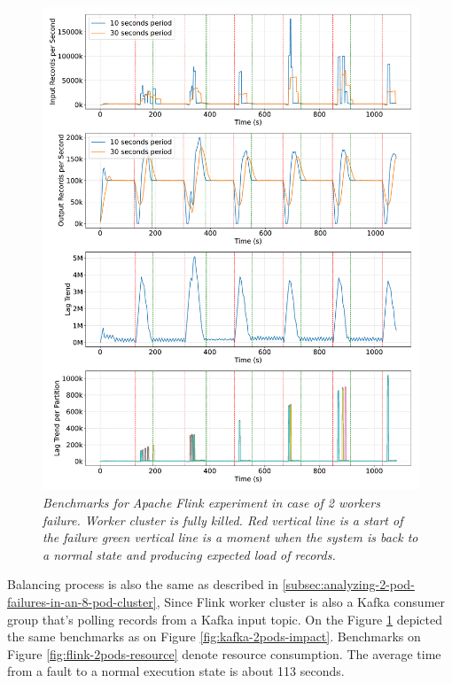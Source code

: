 \begin{figure}[H]
    \centering
    \includegraphics[width=1\textwidth]{figures/flink-2pods/flink_2_pods_plot_impact}
    \caption{\textit{Benchmarks for Apache Flink experiment in case of 2 workers failure. Worker
cluster is fully killed. Red vertical line is a start of the failure green vertical line is a
moment when the system is back to a normal state and producing expected load of records.}}
    \label{fig:flink-2pods-impact}
\end{figure}

Balancing process is also the same as described in \ref{subsec:analyzing-2-pod-failures-in-an-8-pod-cluster},
Since Flink worker cluster is also a Kafka consumer group that's polling records from a Kafka input topic.
On the Figure \ref{fig:flink-2pods-impact} depicted the same benchmarks as on Figure \ref{fig:kafka-2pods-impact}.
Benchmarks on Figure \ref{fig:flink-2pods-resource} denote resource consumption.
The average time from a fault to a normal execution state is about 113 seconds.

